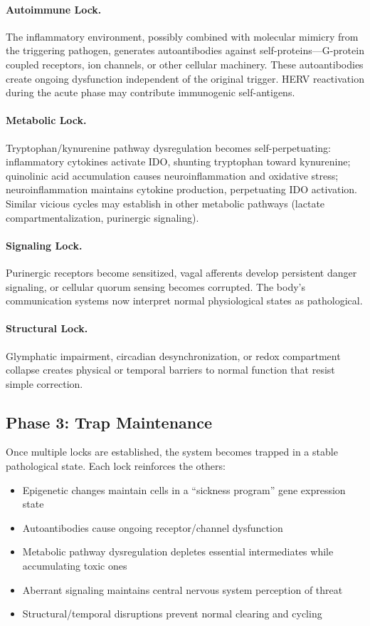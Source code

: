 \paragraph{Autoimmune Lock.} The inflammatory environment, possibly combined with molecular mimicry from the triggering pathogen, generates autoantibodies against self-proteins---G-protein coupled receptors, ion channels, or other cellular machinery. These autoantibodies create ongoing dysfunction independent of the original trigger. HERV reactivation during the acute phase may contribute immunogenic self-antigens.

\paragraph{Metabolic Lock.} Tryptophan/kynurenine pathway dysregulation becomes self-perpetuating: inflammatory cytokines activate IDO, shunting tryptophan toward kynurenine; quinolinic acid accumulation causes neuroinflammation and oxidative stress; neuroinflammation maintains cytokine production, perpetuating IDO activation. Similar vicious cycles may establish in other metabolic pathways (lactate compartmentalization, purinergic signaling).

\paragraph{Signaling Lock.} Purinergic receptors become sensitized, vagal afferents develop persistent danger signaling, or cellular quorum sensing becomes corrupted. The body's communication systems now interpret normal physiological states as pathological.

\paragraph{Structural Lock.} Glymphatic impairment, circadian desynchronization, or redox compartment collapse creates physical or temporal barriers to normal function that resist simple correction.

\subsection{Phase 3: Trap Maintenance}

Once multiple locks are established, the system becomes trapped in a stable pathological state. Each lock reinforces the others:

\begin{itemize}
    \item Epigenetic changes maintain cells in a ``sickness program'' gene expression state
    \item Autoantibodies cause ongoing receptor/channel dysfunction
    \item Metabolic pathway dysregulation depletes essential intermediates while accumulating toxic ones
    \item Aberrant signaling maintains central nervous system perception of threat
    \item Structural/temporal disruptions prevent normal clearing and cycling
\end{itemize}

